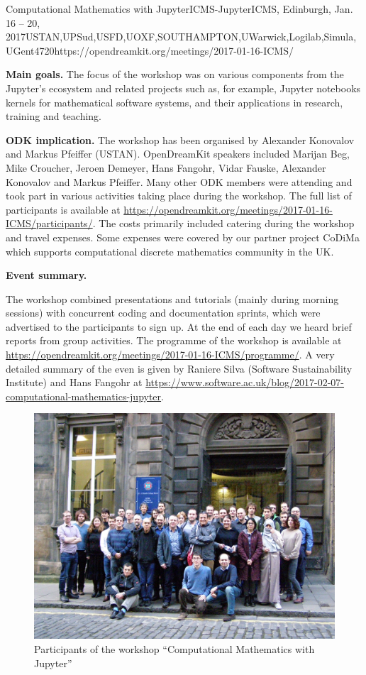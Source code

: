 \begin{event}{Computational Mathematics with Jupyter}{ICMS-Jupyter}{ICMS, Edinburgh, Jan. 16 -- 20, 2017}{USTAN,UPSud,USFD,UOXF,SOUTHAMPTON,UWarwick,Logilab,Simula,UGent}{47}{20}{https://opendreamkit.org/meetings/2017-01-16-ICMS/}

\textbf{Main goals.} The focus of the workshop was on various components from the Jupyter's ecosystem 
and related projects such as, for example, Jupyter notebooks kernels for mathematical software systems,
and their applications in research, training and teaching.

\textbf{ODK implication.} The workshop has been organised by Alexander Konovalov and Markus
Pfeiffer (USTAN). OpenDreamKit speakers included Marijan Beg, Mike Croucher, Jeroen Demeyer,
Hans Fangohr, Vidar Fauske, Alexander Konovalov and Markus Pfeiffer. Many other ODK members
were attending and took part in various activities taking place during the workshop.
The full list of participants is available at
\url{https://opendreamkit.org/meetings/2017-01-16-ICMS/participants/}.
The costs primarily included catering during the workshop and travel expenses.
Some expenses were covered by our partner project CoDiMa which supports computational
discrete mathematics community in the UK.

\textbf{Event summary.}

The workshop combined presentations and tutorials (mainly during morning sessions)
with concurrent coding and documentation sprints, which were advertised to the participants
to sign up. At the end of each day we heard brief reports from group activities.
The programme of the workshop is available
at \url{https://opendreamkit.org/meetings/2017-01-16-ICMS/programme/}. A very detailed
summary of the even is given by Raniere Silva (Software Sustainability Institute) and
Hans Fangohr at \url{https://www.software.ac.uk/blog/2017-02-07-computational-mathematics-jupyter}.

\begin{figure}[ht]
\includegraphics[scale=.14]{ICMS_Jan2017.jpg}
\caption*{Participants of the workshop ``Computational Mathematics with Jupyter''}
\end{figure}

\end{event}